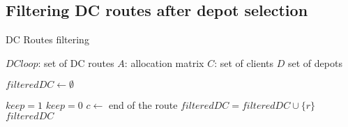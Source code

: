 \documentclass[10pt, a4paper]{article}
\begin{document}
\subsection{Filtering DC routes after depot selection}

\begin{algorithm}
	\caption{DC Routes filtering}
	\label{algo:filtering}
	\begin{algorithmic}[1]
		\REQUIRE $DCloop$: set of DC routes
		\REQUIRE $A$: allocation matrix
		\REQUIRE $C$: set of clients
		\REQUIRE $D$ set of depots
		
		\STATE $filteredDC \leftarrow \emptyset$
				
			\STATE $keep = 1$
					\STATE $keep=0$
					\STATE $c \leftarrow $ end of the route
				\ENDIF
			\ENDFOR  
				\STATE $filteredDC =filteredDC \cup \{r \}$
			\ENDIF
		\ENDFOR
		\RETURN $filtered DC$
	\end{algorithmic}
\end{algorithm}





\newpage



\end{document}
